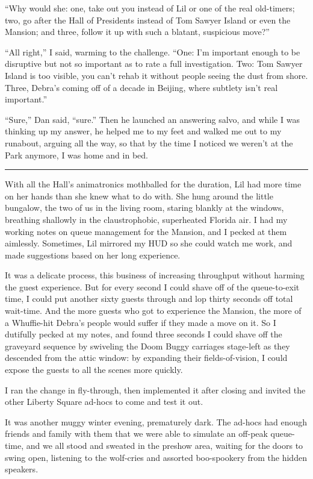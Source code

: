 “Why would she: one, take out you instead of Lil or one of the real
old-timers; two, go after the Hall of Presidents instead of Tom
Sawyer Island or even the Mansion; and three, follow it up with
such a blatant, suspicious move?”

“All right,” I said, warming to the challenge. “One: I'm important
enough to be disruptive but not so important as to rate a full
investigation. Two: Tom Sawyer Island is too visible, you can't
rehab it without people seeing the dust from shore. Three, Debra's
coming off of a decade in Beijing, where subtlety isn't real
important.”

“Sure,” Dan said, “sure.” Then he launched an answering salvo, and
while I was thinking up my answer, he helped me to my feet and
walked me out to my runabout, arguing all the way, so that by the
time I noticed we weren't at the Park anymore, I was home and in
bed.

\begin{center}\rule{3in}{0.4pt}\end{center}

With all the Hall's animatronics mothballed for the duration, Lil
had more time on her hands than she knew what to do with. She hung
around the little bungalow, the two of us in the living room,
staring blankly at the windows, breathing shallowly in the
claustrophobic, superheated Florida air. I had my working notes on
queue management for the Mansion, and I pecked at them aimlessly.
Sometimes, Lil mirrored my HUD so she could watch me work, and made
suggestions based on her long experience.

It was a delicate process, this business of increasing throughput
without harming the guest experience. But for every second I could
shave off of the queue-to-exit time, I could put another sixty
guests through and lop thirty seconds off total wait-time. And the
more guests who got to experience the Mansion, the more of a
Whuffie-hit Debra's people would suffer if they made a move on it.
So I dutifully pecked at my notes, and found three seconds I could
shave off the graveyard sequence by swiveling the Doom Buggy
carriages stage-left as they descended from the attic window: by
expanding their fields-of-vision, I could expose the guests to all
the scenes more quickly.

I ran the change in fly-through, then implemented it after closing
and invited the other Liberty Square ad-hocs to come and test it
out.

It was another muggy winter evening, prematurely dark. The ad-hocs
had enough friends and family with them that we were able to
simulate an off-peak queue-time, and we all stood and sweated in
the preshow area, waiting for the doors to swing open, listening to
the wolf-cries and assorted boo-spookery from the hidden speakers.

